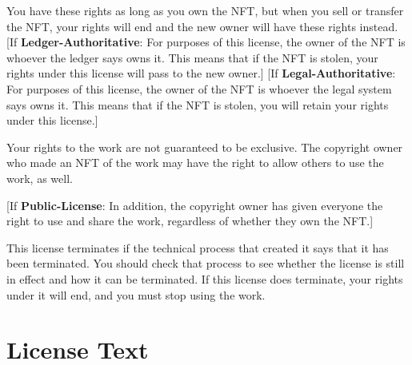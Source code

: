 \documentclass{article}
\newcommand{\keyword}[1]{\textbf{#1}\xspace}
\newcommand{\publiclicense}{\keyword{Public-License}}
\newcommand{\ledger}{\keyword{Ledger-Authoritative}}
\newcommand{\legal}{\keyword{Legal-Authoritative}}
\newcommand{\iflicenseoption}[2]{[\colorbox{light-gray}{If #1:} #2]}
\begin{document}
You have these rights as long as you own the NFT, but when you sell or transfer the NFT, your rights will end and the new owner will have these rights instead. \iflicenseoption{\ledger}{For purposes of this license, the owner of the NFT is whoever the ledger says owns it. This means that if the NFT is stolen, your rights under this license will pass to the new owner.} \iflicenseoption{\legal}{For purposes of this license, the owner of the NFT is whoever the legal system says owns it. This means that if the NFT is stolen, you will retain your rights under this license.}

Your rights to the work are not guaranteed to be exclusive. The copyright owner who made an NFT of the work may have the right to allow others to use the work, as well. 

\iflicenseoption{\publiclicense}{In addition, the copyright owner has given everyone the right to use and share the work, regardless of whether they own the NFT.}

This license terminates if the technical process that created it says that it has been terminated. You should check that process to see whether the license is still in effect and how it can be terminated. If this license does terminate, your rights under it will end, and you must stop using the work.


\section{License Text}
\label{sec:text}
\end{document}
